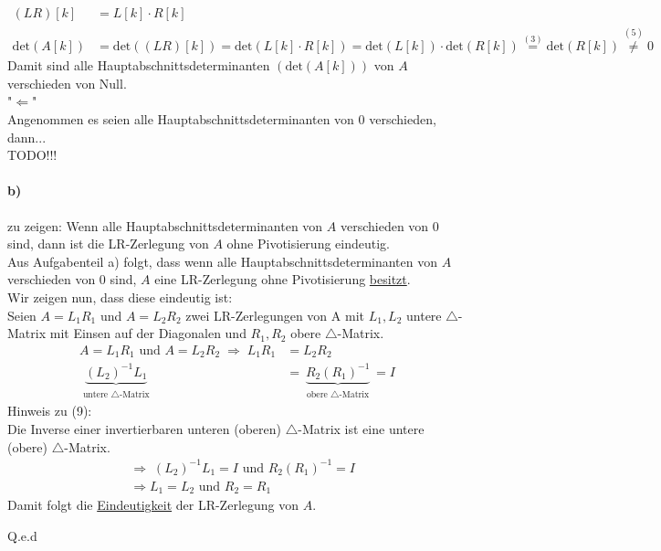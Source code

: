 \begin{align}
(LR)[k]&=L[k]\cdot R[k]\\
\mathrm{det}(A[k])&=\mathrm{det}((LR)[k])= \mathrm{det}(L[k]\cdot R[k])= \mathrm{det}(L[k])\cdot\mathrm{det}(R[k]) \overset{(3)}{=} \mathrm{det}(R[k])\overset{(5)}{\neq}0
\end{align}
Damit sind alle Hauptabschnittsdeterminanten $\left(\mathrm{det}(A[k])\right)$ von $A$ verschieden von Null.\\
\newline
"$\Leftarrow$"\\
Angenommen es seien alle Hauptabschnittsdeterminanten von 0 verschieden, dann...\\
TODO!!!



\paragraph*{b)}
zu zeigen: Wenn alle Hauptabschnittsdeterminanten von $A$ verschieden von 0 sind, dann ist die LR-Zerlegung von $A$ ohne Pivotisierung eindeutig.\\
\newline
Aus Aufgabenteil a) folgt, dass \glqq wenn alle Hauptabschnittsdeterminanten von $A$ verschieden von 0 sind, $A$ eine LR-Zerlegung ohne Pivotisierung \underline{besitzt}.\grqq\\
\newline
Wir zeigen nun, dass diese eindeutig ist:\\
\newline
Seien $ A = L_1R_1 $ und $ A = L_2R_2 $ zwei LR-Zerlegungen von A mit $L_1,L_2$ untere $\triangle$-Matrix mit Einsen auf der Diagonalen und $R_1,R_2$ obere $\triangle$-Matrix.
\begin{align}
	 A = L_1R_1 \text{ und } A = L_2R_2 \;\Rightarrow \; L_1R_1 &=  L_2R_2\\
	 \underbrace{(L_2)^{-1}L_1}_{\substack{\text{untere }\triangle\text{-Matrix}}}
	 &=  \underbrace{R_2(R_1)^{-1}}_{\substack{\text{obere }\triangle\text{-Matrix}}} = I
\end{align}
Hinweis zu (9):\\ Die Inverse einer invertierbaren unteren (oberen) $\triangle$-Matrix ist eine untere (obere) $\triangle$-Matrix.\\
\begin{align}
&\Rightarrow \; (L_2)^{-1}L_1 = I \text{ und } R_2(R_1)^{-1}=I\\
&\Rightarrow L_1=L_2 \text{ und } R_2=R_1
\end{align}
Damit folgt die \underline{Eindeutigkeit} der LR-Zerlegung von $A$.
\begin{flushright}Q.e.d\end{flushright}